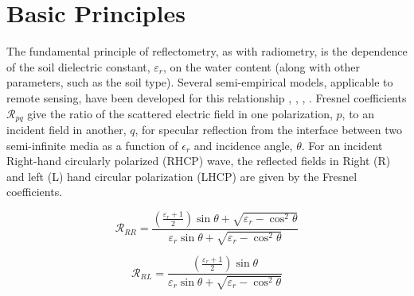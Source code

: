 \documentclass[draftcls,onecolumn]{IEEEtran}  %
\begin{document}
\section{Basic Principles}
The fundamental principle of reflectometry, as with radiometry, is the dependence of the soil dielectric constant,  $\varepsilon_r$,  on the water content (along with other parameters, such as the soil type).  
Several semi-empirical models, applicable to remote sensing,  have been developed for this relationship
\cite{Wang1980},
\cite{Peplinski1995a},
\cite{Dobson1985},
\cite{Mironov2004c}.
Fresnel coefficients $\mathcal{R}_{pq}$ give the ratio of the scattered electric field in one polarization, $p$, to an incident field in another, $q$, for specular reflection from the interface between two semi-infinite media as a function of $\epsilon_r$ and incidence angle, $\theta$.
For an incident Right-hand circularly polarized (RHCP) wave, the reflected fields in Right (R) and left (L) hand circular polarization (LHCP) are given by the Fresnel coefficients. 
%
%
 
\begin{equation} 
	\mathcal{R}_{RR} =  \frac{ \left( \frac{ \varepsilon_r + 1}{2} \right) \sin \theta +  \sqrt{ \varepsilon_r - \cos^2 \theta }}
        {  \varepsilon_r \sin \theta + \sqrt{ \varepsilon_r -\cos^2 \theta }}
     \label{Eq:fresnelRR}
 \end{equation}

 
\begin{equation} 
	\mathcal{R}_{RL} =  \frac{ \left( \frac{ \varepsilon_r + 1}{2} \right) \sin \theta}
        {  \varepsilon_r \sin \theta + \sqrt{ \varepsilon_r -\cos^2 \theta }}
     \label{Eq:fresnelRL}
 \end{equation}
\end{document}
